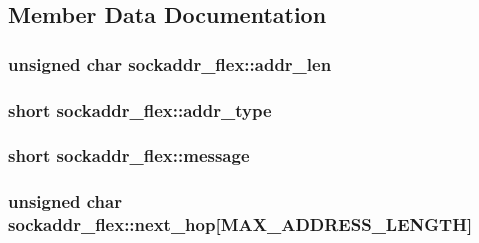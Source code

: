 \subsection{Member Data Documentation}
\subsubsection[{\texorpdfstring{addr\+\_\+len}{addr_len}}]{\setlength{\rightskip}{0pt plus 5cm}unsigned char sockaddr\+\_\+flex\+::addr\+\_\+len}\hypertarget{structsockaddr__flex_a44a4c4cabcecc77838283ed0a2fe22bb}{}\label{structsockaddr__flex_a44a4c4cabcecc77838283ed0a2fe22bb}
\subsubsection[{\texorpdfstring{addr\+\_\+type}{addr_type}}]{\setlength{\rightskip}{0pt plus 5cm}short sockaddr\+\_\+flex\+::addr\+\_\+type}\hypertarget{structsockaddr__flex_a8945354761455603e8f09077e454defe}{}\label{structsockaddr__flex_a8945354761455603e8f09077e454defe}
\subsubsection[{\texorpdfstring{message}{message}}]{\setlength{\rightskip}{0pt plus 5cm}short sockaddr\+\_\+flex\+::message}\hypertarget{structsockaddr__flex_ac1581ee2d027808218f3173c372924a1}{}\label{structsockaddr__flex_ac1581ee2d027808218f3173c372924a1}
\subsubsection[{\texorpdfstring{next\+\_\+hop}{next_hop}}]{\setlength{\rightskip}{0pt plus 5cm}unsigned char sockaddr\+\_\+flex\+::next\+\_\+hop\mbox{[}{\bf M\+A\+X\+\_\+\+A\+D\+D\+R\+E\+S\+S\+\_\+\+L\+E\+N\+G\+TH}\mbox{]}}\hypertarget{structsockaddr__flex_a6869850bbb4ae164d955372332fffee3}{}\label{structsockaddr__flex_a6869850bbb4ae164d955372332fffee3}
